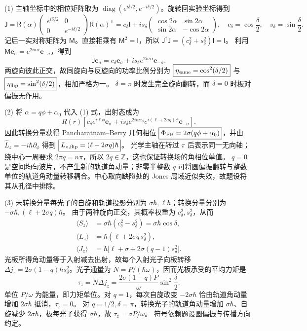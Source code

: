 (1) 主轴坐标中的相位矩阵取为 \(\operatorname{diag}(e^{i\delta/2},e^{-i\delta/2})\)。旋转回实验坐标得到
\[
\mathsf J=\mathsf R(\alpha)
\begin{pmatrix}e^{i\delta/2}&0\\0&e^{-i\delta/2}\end{pmatrix}
\mathsf R(\alpha)^{\mathsf T}
=c_\delta\mathsf I+i s_\delta
\begin{pmatrix}\cos2\alpha&\sin2\alpha\\
\sin2\alpha&-\cos2\alpha\end{pmatrix},
\quad c_\delta=\cos\frac\delta2,\quad s_\delta=\sin\frac\delta2.
\]
记后一实对称矩阵为 \(\mathsf M\)。直接相乘有 \(\mathsf M^2=\mathsf I\)，所以
\(\mathsf J^\dagger\mathsf J=(c_\delta^2+s_\delta^2)\mathsf I=\mathsf I\)。
利用 \(\mathsf M\mathbf e_\sigma=e^{2i\sigma\alpha}\mathbf e_{-\sigma}\)，得到
\[
\boxed{\mathsf J\mathbf e_\sigma=c_\delta\mathbf e_\sigma+
i s_\delta e^{2i\sigma\alpha}\mathbf e_{-\sigma}}.
\]
两旋向彼此正交，故同旋向与反旋向的功率比例分别为
\(\boxed{\eta_{\rm same}=\cos^2(\delta/2)}\) 与
\(\boxed{\eta_{\rm flip}=\sin^2(\delta/2)}\)，相加严格为一。
\(\delta=\pi\) 时发生完全旋向翻转，而 \(\delta=0\) 时板对偏振无作用。

(2) 将 \(\alpha=q\phi+\alpha_0\) 代入 (1) 式，出射态成为
\[
R(r)\left[c_\delta e^{i\ell\phi}\mathbf e_\sigma+
i s_\delta e^{2i\sigma\alpha_0}
e^{i(\ell+2\sigma q)\phi}\mathbf e_{-\sigma}\right].
\]
因此转换分量获得 Pancharatnam--Berry 几何相位
\(\boxed{\Phi_{\rm PB}=2\sigma(q\phi+\alpha_0)}\)，并由
\(\hat L_z=-i\hbar\partial_\phi\) 得到
\(\boxed{L_{z,\rm flip}=(\ell+2\sigma q)\hbar}\)。
光学主轴在转过 \(\pi\) 后表示同一无向轴；绕中心一周要求
\(2\pi q=n\pi\)，所以 \(\boxed{2q\in\mathbb Z}\)，这也保证转换场的角相位单值。
\(q=0\) 是空间均匀波片，不产生新的轨道角动量；非零半整数 \(q\) 可将圆偏振翻转与整数单位的轨道角动量转移耦合。中心取向缺陷处的 Jones 局域近似失效，故题设将其从孔径中排除。

(3) 未转换分量每光子的自旋和轨道投影分别为
\(\sigma\hbar,\ell\hbar\)；转换分量分别为
\(-\sigma\hbar,(\ell+2\sigma q)\hbar\)。
由于两种旋向正交，其概率权重为 \(c_\delta^2,s_\delta^2\)，从而
\[
\begin{aligned}
\langle S_z\rangle&=\sigma\hbar(c_\delta^2-s_\delta^2)
=\sigma\hbar\cos\delta,\\
\langle L_z\rangle&=\hbar(\ell+2\sigma q\,s_\delta^2),\\
\boxed{\langle J_z\rangle}&=\hbar\bigl[\ell+\sigma+
2\sigma(q-1)s_\delta^2\bigr].
\end{aligned}
\]
光板所得角动量等于入射减去出射，故每个入射光子向板转移
\(\Delta j_z=2\sigma(1-q)\hbar s_\delta^2\)。光子通量为
\(\dot N=P/(\hbar\omega)\)，因而光板承受的平均力矩是
\[
\boxed{\tau_z=\dot N\Delta j_z
=\frac{2\sigma(1-q)P}{\omega}\sin^2\frac\delta2}.
\]
单位 \(P/\omega\) 为能量，即力矩单位。对 \(q=1\)，每次自旋改变
\(-2\sigma\hbar\) 恰由轨道角动量增加 \(2\sigma\hbar\) 抵消，\(\tau_z=0\)。
对 \(q=1/2,\delta=\pi\)，转换光子的轨道角动量增加
\(\sigma\hbar\)、自旋减少 \(2\sigma\hbar\)，板每光子获得
\(\boxed{\sigma\hbar}\)，故 \(\tau_z=\sigma P/\omega\)。
符号依赖题设圆偏振与传播方向约定。


